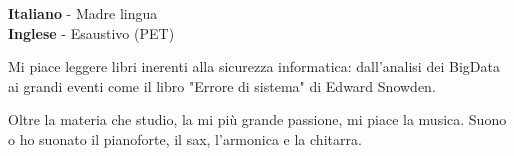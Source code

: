 \documentclass[9pt]{developercv} %
\begin{document}
\begin{minipage}[t]{0.3\textwidth}
	\vspace{-\baselineskip} %


	\textbf{Italiano} - Madre lingua\\
	\textbf{Inglese} - Esaustivo (PET)\\
\end{minipage}
\hfill
\begin{minipage}[t]{0.3\textwidth}
	\vspace{-\baselineskip} %


	Mi piace leggere libri inerenti alla sicurezza informatica: dall'analisi dei BigData ai grandi eventi come il libro "Errore di sistema" di Edward Snowden.
\end{minipage}
\hfill
\begin{minipage}[t]{0.3\textwidth}
	\vspace{-\baselineskip} %


	Oltre la materia che studio, la mi più grande passione, mi piace la musica. Suono o ho suonato il pianoforte, il sax, l'armonica e la chitarra.
\end{minipage}

\end{document}
